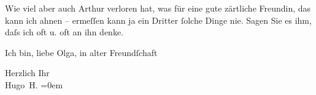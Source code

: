 \pstart
           Wie viel aber auch Arthur verloren hat, was für
               eine gute zärtliche Freundin, das kann ich ahnen – ermeſſen kann ja ein Dritter
               ſolche Dinge nie. Sagen Sie es ihm, daſs ich oft u. oft an ihn denke.\pend
           
\pstart
           {\pb}Ich bin, liebe Olga, in alter Freundſchaft\pend
           
\pstart
           Herzlich Ihr{\\[\baselineskip]}\spacefill\mbox{Hugo H.}\pend
           \leftskip=0em{}\endnumbering{}  
      
